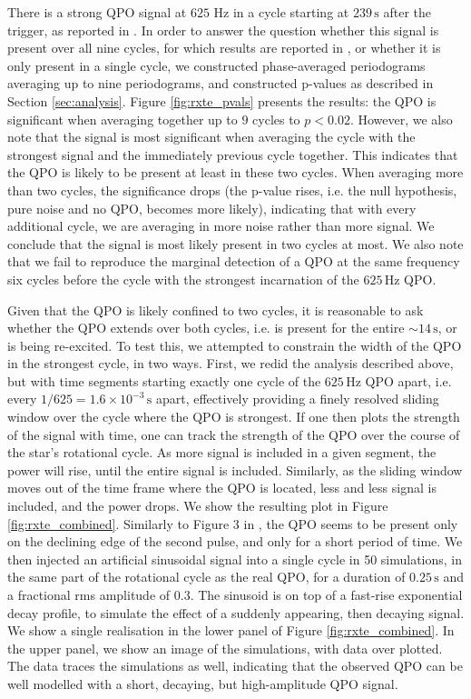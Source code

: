 \documentclass{emulateapj}
\begin{document}
There is a strong QPO signal at $625$ Hz in a cycle starting at $239\, \mathrm{s}$ after the trigger, as reported in \citet{Strohmayer06}. In order to answer the question whether this signal is present over all nine cycles, for which results are reported in \citet{Strohmayer05}, or whether it is only present in a single cycle, we constructed phase-averaged periodograms averaging up to nine periodograms, and constructed p-values as described in Section \ref{sec:analysis}. Figure \ref{fig:rxte_pvals} presents the results: the QPO is significant when averaging together up to $9$ cycles to $p < 0.02$. However, we also note that the signal is most significant when averaging the cycle with the strongest signal and the immediately previous cycle together. This indicates that the QPO is likely to be present at least in these two cycles. When averaging more than two cycles, the significance drops (the p-value rises, i.e. the null hypothesis, pure noise and no QPO, becomes more likely), indicating that with every additional cycle, we are averaging in more noise rather than more signal. We conclude that the signal is most likely present in two cycles at most.
We also note that we fail to reproduce the marginal detection of a QPO at the same frequency six cycles before the cycle with the strongest incarnation of the $625\, \mathrm{Hz}$ QPO. 

Given that the QPO is likely confined to two cycles, it is reasonable to ask whether the QPO extends over both cycles, i.e. is present for the entire $\sim 14\, \mathrm{s}$, or is being re-excited. To test this, we attempted to constrain the width of the QPO in the strongest cycle, in two ways. First, we redid the analysis described above, but with time segments starting exactly one cycle of the $625 \, \mathrm{Hz}$ QPO apart, i.e. every $1/625 = 1.6 \times 10^{-3} \, \mathrm{s}$ apart, effectively providing a finely resolved sliding window over the cycle where the QPO is strongest. If one then plots the strength of the signal with time, one can track the strength of the QPO over the course of the star's rotational cycle. As more signal is included in a given segment, the power will rise, until the entire signal is included. Similarly, as the sliding window moves out of the time frame where the QPO is located, less and less signal is included, and the power drops. We show the resulting plot in Figure \ref{fig:rxte_combined}. Similarly to Figure 3 in \citet{Strohmayer06}, the QPO seems to be present only on the declining edge of the second pulse, and only for a short period of time. We then injected an artificial sinusoidal signal into a single cycle in 50 simulations, in the same part of the rotational cycle as the real QPO, for a duration of $0.25\, \mathrm{s}$ and a fractional rms amplitude of $0.3$. The sinusoid is on top of a fast-rise exponential decay profile, to simulate the effect of a suddenly appearing, then decaying signal. We show a single realisation in the lower panel of Figure \ref{fig:rxte_combined}. In the upper panel, we show an image of the simulations, with data over plotted. The data traces the simulations as well, indicating that the observed QPO can be well modelled with a short, decaying, but high-amplitude QPO signal. 
\end{document}

